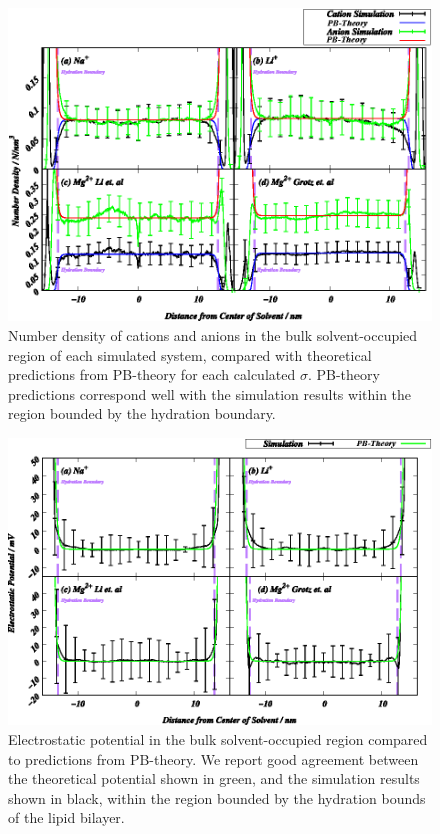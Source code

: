 \documentclass[journal=langd5,manuscript=article]{achemso}
\begin{document}
\begin{figure}
    \caption{Number density of cations and anions in the bulk solvent-occupied region of each
    simulated system, compared with theoretical predictions from PB-theory for each calculated $\sigma$. PB-theory predictions
    correspond well with the simulation results within the region bounded by the hydration boundary.}
    \label{fig:catgcdens}
    \includegraphics[width=\textwidth]{Figure_5.eps}
\end{figure}
\clearpage
\begin{figure}
    \caption{Electrostatic potential in the bulk solvent-occupied region compared to predictions from PB-theory. We report good
    agreement between the theoretical potential shown in green, and the simulation results shown in black, within the region bounded by the hydration
    bounds of the lipid bilayer.}
    \label{fig:potgc}
    \includegraphics[width=\textwidth]{Figure_6.eps}
\end{figure}
\end{document}
